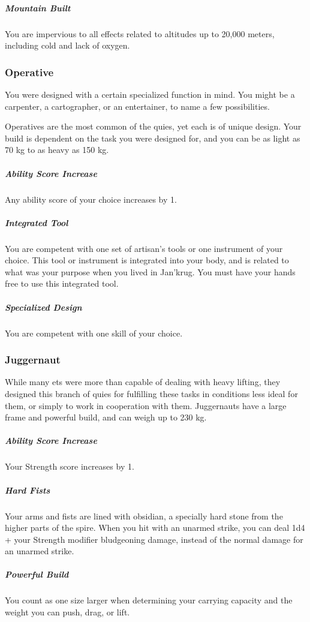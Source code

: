     \subparagraph{Mountain Built} You are impervious to all effects related to altitudes up to 20,000 meters, including cold and lack of oxygen.

\subsubsection{Operative}
    You were designed with a certain specialized function in mind.
    You might be a carpenter, a cartographer, or an entertainer, to name a few possibilities.

    Operatives are the most common of the quies, yet each is of unique design.
    Your build is dependent on the task you were designed for, and you can be as light as 70 kg to as heavy as 150 kg.

    \subparagraph{Ability Score Increase} Any ability score of your choice increases by 1.

    \subparagraph{Integrated Tool} You are competent with one set of artisan's tools or one instrument of your choice.
    This tool or instrument is integrated into your body, and is related to what was your purpose when you lived in Jan'krug.
    You must have your hands free to use this integrated tool.

    \subparagraph{Specialized Design} You are competent with one skill of your choice.

\subsubsection{Juggernaut}
    While many ets were more than capable of dealing with heavy lifting, they designed this branch of quies for fulfilling these tasks in conditions less ideal for them, or simply to work in cooperation with them.
    Juggernauts have a large frame and powerful build, and can weigh up to 230 kg.

    \subparagraph{Ability Score Increase} Your Strength score increases by 1.

    \subparagraph{Hard Fists} Your arms and fists are lined with obsidian, a specially hard stone from the higher parts of the spire.
    When you hit with an unarmed strike, you can deal 1d4 + your Strength modifier bludgeoning damage, instead of the normal damage for an unarmed strike.

    \subparagraph{Powerful Build} You count as one size larger when determining your carrying capacity and the weight you can push, drag, or lift.

